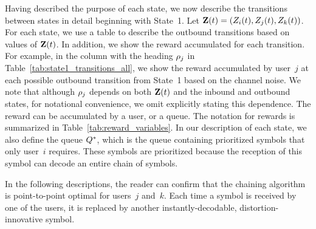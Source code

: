 Having described the purpose of each state, we now describe the transitions between states in detail beginning with State~1.  Let $\mathbf{Z}(t) = (Z_{i}(t), Z_{j}(t), Z_{k}(t))$.  For each state, we use a table to describe the outbound transitions based on values of $\mathbf{Z}(t)$.  In addition, we show the reward accumulated for each transition.  For example, in the column with the heading $\rho_{j}$ in Table~\ref{tab:state1_transitions_all}, we show the reward accumulated by user~$j$ at each possible outbound transition from State~1 based on the channel noise.  We note that although $\rho_{j}$ depends on both $\mathbf{Z}(t)$ and the inbound and outbound states, for notational convenience, we omit explicitly stating this dependence.  The reward can be accumulated by a user, or a queue.  The notation for rewards is summarized in Table~\ref{tab:reward_variables}.  In our description of each state, we also define the queue $Q^{*}$, which is the queue containing prioritized symbols that only user~$i$ requires.  These symbols are prioritized because the reception of this symbol can decode an entire chain of symbols.  

In the following descriptions, the reader can confirm that the chaining algorithm is point-to-point optimal for users~$j$ and~$k$.  Each time a symbol is received by one of the users, it is replaced by another instantly-decodable, distortion-innovative symbol.



